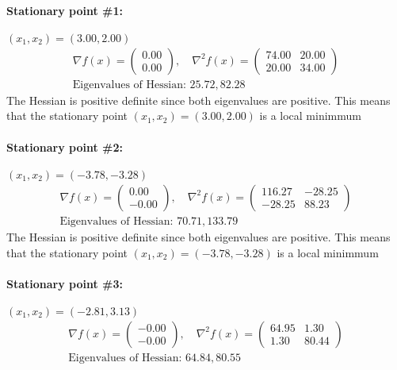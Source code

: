 \paragraph{Stationary point \#1:} $(x_1,x_2) = (3.00,2.00)$
\begin{gather*}
\nabla f(x) = \begin{pmatrix} 0.00 \\ 0.00 \end{pmatrix}, \quad 
\nabla^2 f(x) = \begin{pmatrix} 74.00 & 20.00 \\ 20.00 & 34.00 \end{pmatrix} \\ 
\text{Eigenvalues of Hessian: } 25.72, 82.28\end{gather*}
The Hessian is positive definite since both eigenvalues are positive. This means that the stationary point $(x_1,x_2) = (3.00,2.00)$ is a local minimmum\paragraph{Stationary point \#2:} $(x_1,x_2) = (-3.78,-3.28)$
\begin{gather*}
\nabla f(x) = \begin{pmatrix} 0.00 \\ -0.00 \end{pmatrix}, \quad 
\nabla^2 f(x) = \begin{pmatrix} 116.27 & -28.25 \\ -28.25 & 88.23 \end{pmatrix} \\ 
\text{Eigenvalues of Hessian: } 70.71, 133.79\end{gather*}
The Hessian is positive definite since both eigenvalues are positive. This means that the stationary point $(x_1,x_2) = (-3.78,-3.28)$ is a local minimmum\paragraph{Stationary point \#3:} $(x_1,x_2) = (-2.81,3.13)$
\begin{gather*}
\nabla f(x) = \begin{pmatrix} -0.00 \\ -0.00 \end{pmatrix}, \quad 
\nabla^2 f(x) = \begin{pmatrix} 64.95 & 1.30 \\ 1.30 & 80.44 \end{pmatrix} \\ 
\text{Eigenvalues of Hessian: } 64.84, 80.55\end{gather*}
